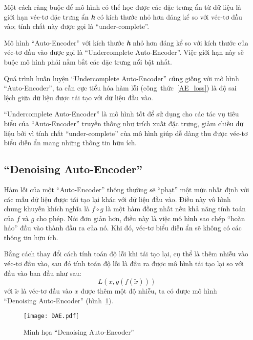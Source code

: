     Một cách ràng buộc để mô hình có thể học được các đặc trưng ẩn từ dữ liệu
    là giới hạn véc-tơ đặc trưng ẩn \textbf{\textit{h}} có kích thước nhỏ hơn đáng kể so với véc-tơ đầu vào;
    tính chất này được gọi là ``under-complete''.
    
    Mô hình ``Auto-Encoder'' với kích thước \textbf{\textit{h}} nhỏ hơn đáng kể so với kích thước của véc-tơ đầu vào
    được gọi là ``Undercomplete Auto-Encoder''. Việc giới hạn này sẽ buộc mô hình phải nắm bắt các đặc trưng
    nổi bật nhất.

    Quá trình huấn luyện ``Undercomplete Auto-Encoder'' cũng giống với mô hình ``Auto-Encoder'',
    ta cần cực tiểu hóa hàm lỗi (công~thức~\ref{AE_loss}) là độ sai lệch giữa dữ liệu được tái tạo
    với dữ liệu đầu vào.

    ``Undercomplete Auto-Encoder'' là mô hình tốt để sử dụng cho các tác vụ tiêu biểu của ``Auto-Encoder'' truyền thống
    như trích xuất đặc trưng, giảm chiều dữ liệu 
    bởi vì tính chất ``under-complete'' của mô hình giúp dễ dàng thu được véc-tơ biểu diễn ẩn mang những thông tin hữu ích.


    \subsection{``Denoising Auto-Encoder''}
    \label{chap2/subsec12}
    
    Hàm lỗi của một ``Auto-Encoder'' thông thường sẽ ``phạt'' một mức nhất định với các mẫu dữ liệu được tái tạo lại
    khác với dữ liệu đầu vào. Điều này vô hình chung khuyến khích 
    nghĩa là 
    \begin{math}
        f \circ g
    \end{math}
    là một hàm đồng nhất nếu khả năng tính toán của 
    \begin{math}
        f
    \end{math} 
    và
    \begin{math}
        g
    \end{math}
    cho phép. Nói đơn giản hơn, điều này là việc mô hình sao chép ``hoàn hảo'' đầu vào thành đầu ra của nó.
    Khi đó, véc-tơ biểu diễn ẩn sẽ không có các thông tin hữu ích. 

    Bằng cách thay đổi cách tính toán độ lỗi khi tái tạo lại, cụ thể là thêm nhiễu vào véc-tơ đầu vào, 
    sau đó tính toán độ lỗi là đầu ra được mô hình tái tạo lại so với đầu vào ban đầu như sau:
    \begin{equation}
        L(x, g(f(\tilde{x})))
    \end{equation}
    với 
    \begin{math} \tilde{x} \end{math}
    là véc-tơ đầu vào 
    \begin{math}
        x
    \end{math} 
    được thêm một độ nhiễu, ta có được mô hình ``Denoising Auto-Encoder'' (hình~\ref{fig_DAE}). 
    \begin{figure}
        \centering
        \texttt{[image: DAE.pdf]}
        \caption{Minh họa ``Denoising Auto-Encoder''}
        \label{fig_DAE}
    \end{figure}
    
